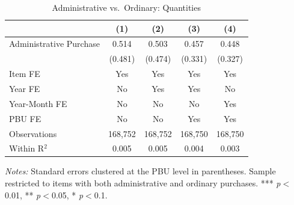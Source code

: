 \begin{table}[ht]
  \centering
  \caption{Administrative vs.\ Ordinary: Quantities}
  \label{tab:v8_adm_quantities}
  \small
  \begin{threeparttable}
  \begin{tabular}{lcccc}
    \hline\hline
    & (1) & (2) & (3) & (4) \\
    \hline
    Administrative Purchase & 0.514 & 0.503 & 0.457 & 0.448 \\
     & (0.481) & (0.474) & (0.331) & (0.327) \\[3pt]
    \hline
    Item FE & Yes & Yes & Yes & Yes \\
    Year FE & No & Yes & Yes & No \\
    Year-Month FE & No & No & No & Yes \\
    PBU FE & No & No & Yes & Yes \\
    Observations & 168,752 & 168,752 & 168,750 & 168,750 \\
    Within R$^2$ & 0.005 & 0.005 & 0.004 & 0.003 \\
    \hline\hline
  \end{tabular}
  \begin{tablenotes}
    \small
    \item \textit{Notes:} Standard errors clustered at the PBU level in parentheses. Sample restricted to items with both administrative and ordinary purchases. *** \textit{p}$<$0.01, ** \textit{p}$<$0.05, * \textit{p}$<$0.1.
  \end{tablenotes}
  \end{threeparttable}
\end{table}

